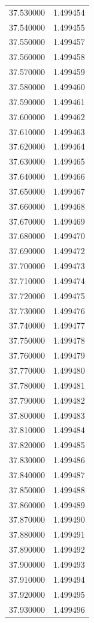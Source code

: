\begin{tabular}{rr}
37.530000 & 1.499454 \\
37.540000 & 1.499455 \\
37.550000 & 1.499457 \\
37.560000 & 1.499458 \\
37.570000 & 1.499459 \\
37.580000 & 1.499460 \\
37.590000 & 1.499461 \\
37.600000 & 1.499462 \\
37.610000 & 1.499463 \\
37.620000 & 1.499464 \\
37.630000 & 1.499465 \\
37.640000 & 1.499466 \\
37.650000 & 1.499467 \\
37.660000 & 1.499468 \\
37.670000 & 1.499469 \\
37.680000 & 1.499470 \\
37.690000 & 1.499472 \\
37.700000 & 1.499473 \\
37.710000 & 1.499474 \\
37.720000 & 1.499475 \\
37.730000 & 1.499476 \\
37.740000 & 1.499477 \\
37.750000 & 1.499478 \\
37.760000 & 1.499479 \\
37.770000 & 1.499480 \\
37.780000 & 1.499481 \\
37.790000 & 1.499482 \\
37.800000 & 1.499483 \\
37.810000 & 1.499484 \\
37.820000 & 1.499485 \\
37.830000 & 1.499486 \\
37.840000 & 1.499487 \\
37.850000 & 1.499488 \\
37.860000 & 1.499489 \\
37.870000 & 1.499490 \\
37.880000 & 1.499491 \\
37.890000 & 1.499492 \\
37.900000 & 1.499493 \\
37.910000 & 1.499494 \\
37.920000 & 1.499495 \\
37.930000 & 1.499496 \\

\end{tabular}
